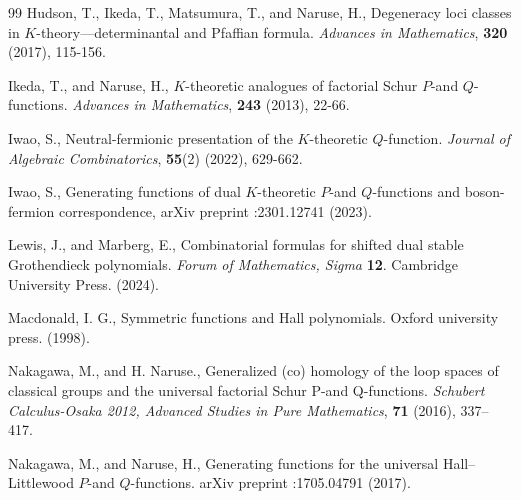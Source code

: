 \documentclass[dvipdfmx]{amsart}
\theoremstyle{definition}
\theoremstyle{remark}
\begin{document}
\begin{thebibliography}{99}
%
%
Hudson, T., Ikeda, T., Matsumura, T., and Naruse, H.,  Degeneracy loci classes in $K$-theory—determinantal and Pfaffian formula. 
\textit{Advances in Mathematics}, \textbf{320} (2017), 115-156.


Ikeda, T., and Naruse, H., $K$-theoretic analogues of factorial Schur $P$-and $Q$-functions. 
\textit{Advances in Mathematics}, \textbf{243} (2013), 22-66.

Iwao, S.,  Neutral-fermionic presentation of the $K$-theoretic $Q$-function. \textit{Journal of Algebraic Combinatorics}, \textbf{55}(2) (2022), 629-662.

Iwao, S., Generating functions of dual $ K $-theoretic $ P $-and $ Q $-functions and boson-fermion correspondence, arXiv preprint :2301.12741 (2023).

Lewis, J., and Marberg, E., Combinatorial formulas for shifted dual stable Grothendieck polynomials. \textit{Forum of Mathematics, Sigma} \textbf{12}. Cambridge University Press. (2024). 

Macdonald, I. G., Symmetric functions and Hall polynomials. Oxford university press. (1998).

Nakagawa, M., and H. Naruse., Generalized (co) homology of the loop spaces of classical groups and the universal factorial Schur P-and Q-functions. 
\textit{Schubert Calculus-Osaka 2012, Advanced Studies in Pure Mathematics}, \textbf{71} (2016), 337–417. 


Nakagawa, M., and Naruse, H., Generating functions for the universal Hall–Littlewood $P$-and $Q$-functions.
arXiv preprint :1705.04791 (2017).


\end{thebibliography}
\end{document}
